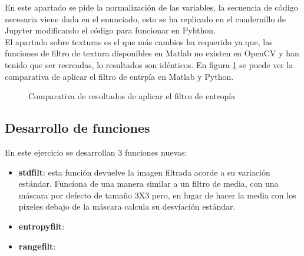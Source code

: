 \documentclass[a4paper,12pt]{report}
\begin{document}
En este apartado se pide la normalización de las variables, la secuencia de código necesaria viene dada en el enunciado, esto se ha replicado en el cuadernillo de Jupyter modificando el código para funcionar en Pyhthon.\\

El apartado sobre texturas es el que más cambios ha requerido ya que, las funciones de filtro de textura disponibles en Matlab no existen en OpenCV y han tenido que ser recreadas, lo resultados son idénticos. En figura \ref{entropyfilt} se puede ver la comparativa de aplicar el filtro de entrpía en Matlab y Python.

\begin{figure}[!tbp]
  \centering
  \hfill
  \caption{Comparativa de resultados de aplicar el filtro de entropía}
  \label{entropyfilt}
\end{figure}


\subsection{Desarrollo de funciones}

En este ejercicio se desarrollan 3 funciones nuevas:
\begin{itemize}
	\item \textbf{ stdfilt}: esta función devuelve la imagen filtrada acorde a su variación estándar. Funciona de una manera similar a un filtro de media, con una máscara por defecto de tamaño 3X3 pero, en lugar de hacer la media con los píxeles debajo de la máscara calcula su desviación estándar.
	\item \textbf{ entropyfilt}:
	\item \textbf{rangefilt}:
\end{itemize}
\end{document}

